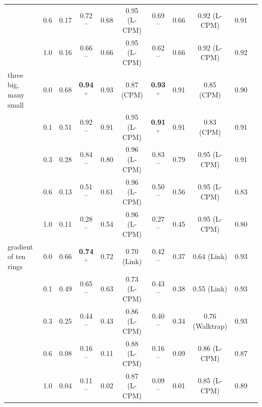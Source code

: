 \begin{table}[t]
\begin{ruledtabular}
\begin{tabular}{lcccccccccc}
 & 0.6 & 0.17 & 0.72$^-$ & 0.68 & 0.95 (L-CPM) & 0.69$^-$ & 0.66 & 0.92 (L-CPM) & 0.91 \\
 & 1.0 & 0.16 & 0.66$^-$ & 0.66 & 0.95 (L-CPM) & 0.62$^-$ & 0.66 & 0.92 (L-CPM) & 0.92 \\
\hline
three big, many small & 0.0 & 0.68 & \textbf{0.94$^+$} & 0.93 & 0.87 (CPM) & \textbf{0.93$^+$} & 0.91 & 0.85 (CPM) & 0.90 \\
 & 0.1 & 0.51 & 0.92$^-$ & 0.91 & 0.95 (L-CPM) & \textbf{0.91$^+$} & 0.91 & 0.83 (CPM) & 0.91 \\
 & 0.3 & 0.28 & 0.84$^-$ & 0.80 & 0.96 (L-CPM) & 0.83$^-$ & 0.79 & 0.95 (L-CPM) & 0.91 \\
 & 0.6 & 0.13 & 0.51$^-$ & 0.61 & 0.96 (L-CPM) & 0.50$^-$ & 0.56 & 0.95 (L-CPM) & 0.83 \\
 & 1.0 & 0.11 & 0.28$^-$ & 0.54 & 0.96 (L-CPM) & 0.27$^-$ & 0.45 & 0.95 (L-CPM) & 0.80 \\
\hline
gradient of ten rings & 0.0 & 0.66 & \textbf{0.74$^+$} & 0.72 & 0.70 (Link) & 0.42$^-$ & 0.37 & 0.64 (Link) & 0.93 \\
 & 0.1 & 0.49 & 0.65$^-$ & 0.63 & 0.73 (L-CPM) & 0.43$^-$ & 0.38 & 0.55 (Link) & 0.93 \\
 & 0.3 & 0.25 & 0.44$^-$ & 0.43 & 0.86 (L-CPM) & 0.40$^-$ & 0.34 & 0.76 (Walktrap) & 0.93 \\
 & 0.6 & 0.08 & 0.16$^-$ & 0.11 & 0.88 (L-CPM) & 0.16$^-$ & 0.09 & 0.86 (L-CPM) & 0.87 \\
 & 1.0 & 0.04 & 0.11$^-$ & 0.02 & 0.87 (L-CPM) & 0.09$^-$ & 0.01 & 0.85 (L-CPM) & 0.89 \\
\end{tabular}
\end{ruledtabular}
\end{table}
